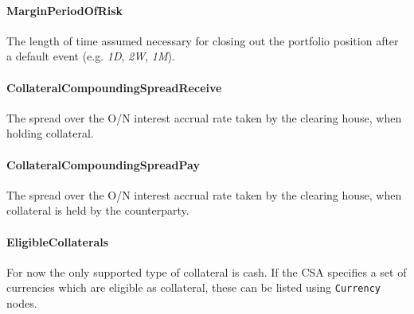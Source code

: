 \paragraph{MarginPeriodOfRisk} The length of time assumed necessary
for closing out the portfolio position after a default event  (e.g. \emph{1D},
  \emph{2W}, \emph{1M}).

\paragraph{CollateralCompoundingSpreadReceive} The spread over the O/N
interest accrual rate taken by the clearing house, when holding
collateral.

\paragraph{CollateralCompoundingSpreadPay} The spread over the O/N
interest accrual rate taken by the clearing house, when collateral is
held by the counterparty.

\paragraph{EligibleCollaterals} For now the only supported type of
collateral is cash. If the CSA specifies a set of currencies which
are eligible as collateral, these can be listed using
\lstinline!Currency! nodes.


